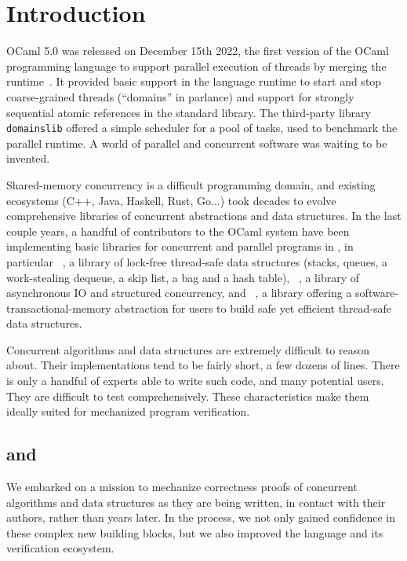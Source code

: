 \section{Introduction}
\label{sec:introduction}

OCaml 5.0 was released on December 15th 2022, the first version of the
OCaml programming language to support parallel execution of \OCaml
threads by merging the \MulticoreOCaml
runtime~\citep*{multicore-ocaml}. It provided basic support in the
language runtime to start and stop coarse-grained threads (``domains''
in \OCaml parlance) and support for strongly sequential atomic
references in the standard library. The third-party library
\texttt{domainslib} offered a simple scheduler for a pool of tasks,
used to benchmark the parallel runtime. A world of parallel and
concurrent software was waiting to be invented.

Shared-memory concurrency is a difficult programming domain, and
existing ecosystems (C++, Java, Haskell, Rust, Go...) took decades to
evolve comprehensive libraries of concurrent abstractions and data
structures. In the last couple years, a handful of contributors to the
OCaml system have been implementing basic libraries for concurrent and
parallel programs in \OCaml, in particular \Saturn~\citep*{saturn},
a library of lock-free thread-safe data structures (stacks, queues,
a work-stealing dequeue, a skip list, a bag and a hash table),
\Eio~\citep*{eio}, a library of asynchronous IO and structured
concurrency, and \Kcas~\citep*{kcas}, a library offering
a software-transactional-memory abstraction for users to build safe
yet efficient thread-safe data structures.

Concurrent algorithms and data structures are extremely difficult to
reason about. Their implementations tend to be fairly short, a few
dozens of lines. There is only a handful of experts able to write such
code, and many potential users. They are difficult to test
comprehensively. These characteristics make them ideally suited for
mechanized program verification.

\subsection{\OCaml and \ZooLang}

We embarked on a mission to mechanize correctness proofs of \OCaml
concurrent algorithms and data structures as they are being written,
in contact with their authors, rather than years later. In the
process, we not only gained confidence in these complex new building
blocks, but we also improved the \OCaml language and its verification
ecosystem.

